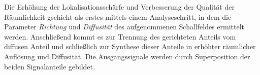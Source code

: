 Die Erhöhung der Lokalisationsschärfe und Verbesserung der Qualität der Räumlichkeit gschieht als erstes mittels einem Analyseschritt, in dem die Parameter \textit{Richtung} und \textit{Diffusität} des aufgenommenen Schallfeldes ermittelt werden. Anschließend kommt es zur Trennung des gerichteten Anteils vom diffusen Anteil und schließlich zur Synthese dieser Anteile in erhöhter räumlicher Auflösung und Diffusität. Die Ausgangssignale werden durch Superposition der beiden Signalanteile gebildet.